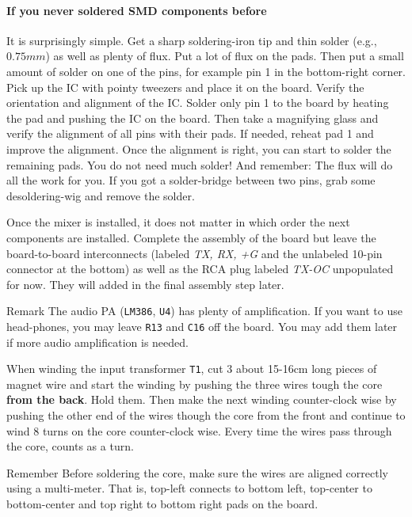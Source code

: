 \documentclass[10pt, a4paper,twoside]{scrartcl}
\newenvironment{remember}{\begin{bclogo}[couleur=blue!30,arrondi=.1,logo=\bccrayon,ombre=true]{Remember}}{\end{bclogo}}
\newenvironment{remark}{\begin{bclogo}[couleur=blue!30,arrondi=.1,logo=\bcinfo,ombre=true]{Remark}}{\end{bclogo}}
\begin{document}
\paragraph{If you never soldered SMD components before} It is surprisingly simple. Get a sharp soldering-iron tip and thin solder (e.g., $0.75mm$) as well as plenty of flux. Put a lot of flux on the pads. Then put a small amount of solder on one of the pins, for example pin 1 in the bottom-right corner. Pick up the IC with pointy tweezers and place it on the board. Verify the orientation and alignment of the IC. Solder only pin 1 to the board by heating the pad and pushing the IC on the board. Then take a magnifying glass and verify the alignment of all pins with their pads. If needed, reheat pad 1 and improve the alignment. Once the alignment is right, you can start to solder the remaining pads. You do not need much solder! And remember: The flux will do all the work for you. If you got a solder-bridge between two pins, grab some desoldering-wig and remove the solder. 

Once the mixer is installed, it does not matter in which order the next components are installed. Complete the assembly of the board but leave the board-to-board interconnects (labeled \emph{TX, RX, +G} and the unlabeled 10-pin connector at the bottom) as well as the RCA plug labeled \emph{TX-OC } unpopulated for now. They will added in the final assembly step later.

\begin{remark}
The audio PA (\texttt{LM386}, \texttt{U4}) has plenty of amplification. If you want to use head-phones, you may leave \texttt{R13} and \texttt{C16} off the board. You may add them later if more audio amplification is needed.
\end{remark}

When winding the input transformer \texttt{T1}, cut 3 about 15-16cm long pieces of magnet wire and start the winding by pushing the three wires tough the core \textbf{from the back}. Hold them. Then make the next winding counter-clock wise by pushing the other end of the wires though the core from the front and continue to wind 8 turns on the core counter-clock wise. Every time the wires pass through the core, counts as a turn. 

\begin{remember}
Before soldering the core, make sure the wires are aligned correctly using a multi-meter. That is, top-left connects to bottom left, top-center to bottom-center and top right to bottom right pads on the board. 
\end{remember}
\end{document}
